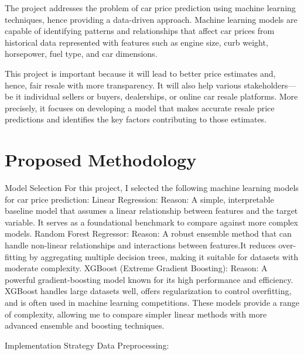 \documentclass[journal]{IEEEtran}
\begin{document}
The project addresses the problem of car price prediction using machine learning techniques, hence providing a data-driven approach. Machine learning models are capable of identifying patterns and relationships that affect car prices from historical data represented with features such as engine size, curb weight, horsepower, fuel type, and car dimensions.

This project is important because it will lead to better price estimates and, hence, fair resale with more transparency. It will also help various stakeholders—be it individual sellers or buyers, dealerships, or online car resale platforms. More precisely, it focuses on developing a model that makes accurate resale price predictions and identifies the key factors contributing to those estimates.
\section{Proposed Methodology}

Model Selection\newline
For this project, I selected the following machine learning models for car price prediction:\vspace{2mm}
\newline
Linear Regression:
\newline
Reason: A simple, interpretable baseline model that assumes a linear relationship between features and the target variable. It serves as a foundational benchmark to compare against more complex models.\vspace{2mm}
\newline
Random Forest Regressor:
\newline
Reason: A robust ensemble method that can handle non-linear relationships and interactions between features.It reduces over-fitting by aggregating multiple decision trees, making it suitable for datasets with moderate complexity.\vspace{2mm}
\newline
XGBoost (Extreme Gradient Boosting):
\newline
Reason: A powerful gradient-boosting model known for its high performance and efficiency. XGBoost handles large datasets well, offers regularization to control overfitting, and is often used in machine learning competitions.
These models provide a range of complexity, allowing me to compare simpler linear methods with more advanced ensemble and boosting techniques.

Implementation Strategy
Data Preprocessing:\vspace{2mm}
\end{document}
